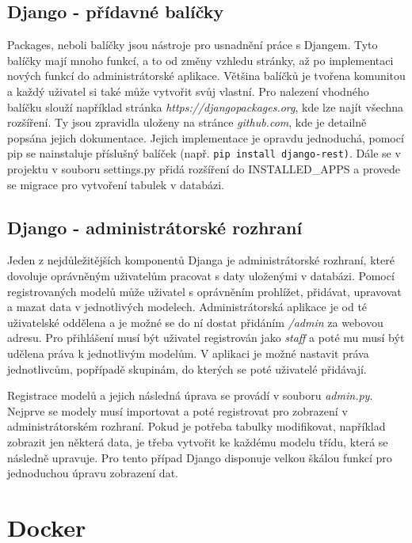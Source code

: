 \newpage

\subsection{Django - přídavné balíčky}

Packages, neboli balíčky jsou nástroje pro usnadnění práce s
Djangem. Tyto balíčky mají mnoho funkcí, a to od změny vzhledu
stránky, až po implementaci nových funkcí do administrátorské aplikace. Většina
balíčků je tvořena komunitou a každý uživatel si také může vytvořit
svůj vlastní. Pro nalezení vhodného balíčku slouží například stránka
\textit{https://djangopackages.org}, kde lze najít všechna
rozšíření. Ty jsou zpravidla uloženy na stránce \textit{github.com}, kde
je detailně popsána jejich dokumentace. Jejich implementace je opravdu
jednoduchá, pomocí pip se nainstaluje příslušný balíček (např. {\tt pip
install django-rest)}. Dále se v projektu v souboru settings.py přidá
rozšíření do INSTALLED\_APPS a provede se migrace pro
vytvo\-ření tabulek v databázi. \cite{django-packages}

\subsection{Django - administrátorské rozhraní}

Jeden z nejdůležitějších komponentů Djanga je administrátorské
rozhraní, které dovoluje oprávněným uživatelům pracovat s daty
uloženými v databázi. Pomocí regi\-strovaných modelů může uživatel s
oprávněním prohlížet, přidávat, upravovat a mazat data v jednotlivých
modelech. Administrátorská aplikace je od té uživatelské oddělena a je
možné se do ní dostat přidáním \textit{/admin} za webovou adresu. Pro
při\-hlášení musí být uživatel registrován jako \textit{staff} a poté mu
musí být udělena práva k jednotlivým modelům. V aplikaci je možné
nastavit práva jednotlivcům, popřípadě skupinám, do kterých se poté
uživatelé přidávají.

Registrace modelů a jejich následná úprava se provádí v souboru
\emph{admin.py}. Nej\-prve se modely musí importovat a poté registrovat pro
zobrazení v administrátorském rozhraní. Pokud je potřeba tabulky
modifikovat, například zobrazit jen některá data, je třeba vytvořit ke
každému modelu třídu, která se následně upravuje. Pro tento případ
Django disponuje velkou škálou funkcí pro jednoduchou úpravu zobrazení
dat. \cite{django-admin}

\newpage

\section{Docker}


